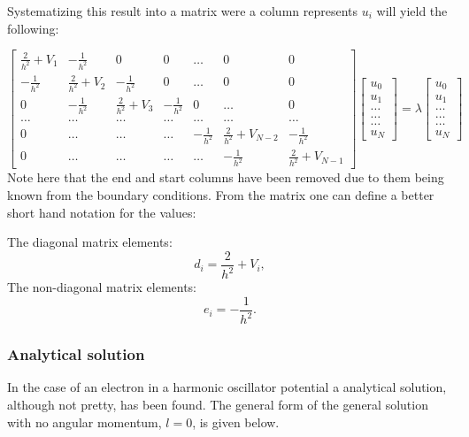 Systematizing this result into a matrix were a column represents $u_i$ will yield the following:

\begin{equation}
	\begin{bmatrix} \frac{2}{h^2}+V_1 & -\frac{1}{h^2} & 0   & 0    & \dots  &0     & 0 \\
		-\frac{1}{h^2} & \frac{2}{h^2}+V_2 & -\frac{1}{h^2} & 0    & \dots  &0     &0 \\
		0   & -\frac{1}{h^2} & \frac{2}{h^2}+V_3 & -\frac{1}{h^2}  &0       &\dots & 0\\
		\dots  & \dots & \dots & \dots  &\dots      &\dots & \dots\\
		0   & \dots & \dots & \dots  &-\frac{1}{h^2}  &\frac{2}{h^2}+V_{N-2} & -\frac{1}{h^2}\\
		0   & \dots & \dots & \dots  &\dots       &-\frac{1}{h^2} & \frac{2}{h^2}+V_{N-1}
	\end{bmatrix}
 	 \begin{bmatrix} u_{0} \\
		u_{1} \\
		\dots\\ \dots\\ \dots\\
		u_{N}
	\end{bmatrix}=\lambda\begin{bmatrix} u_{0} \\
	u_{1} \\
	\dots\\ \dots\\ \dots\\
	u_{N}
	\end{bmatrix}
	\label{eq:matrixse} 
\end{equation}
Note here that the end and start columns have been removed due to them being known from the boundary conditions. From the matrix one can define a better short hand notation for the values:

The diagonal matrix elements:
\begin{equation*}
d_i=\frac{2}{h^2}+V_i,
\end{equation*}
The non-diagonal matrix elements:
\begin{equation*}
e_i=-\frac{1}{h^2}.
\end{equation*}
\subsubsection*{Analytical solution}
In the case of an electron in a harmonic oscillator potential a analytical solution, although not pretty, has been found. The general form of the general solution with no angular momentum, $l=0$, is given below.

